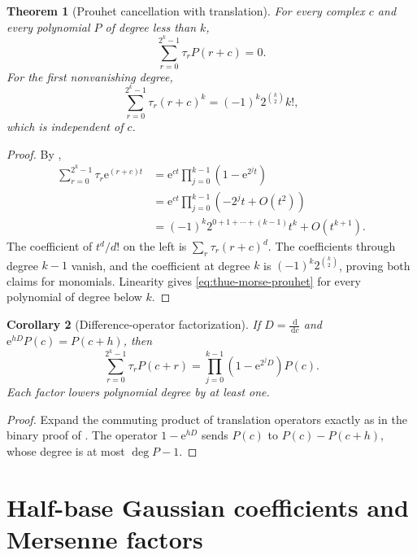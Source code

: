 \documentclass[11pt,oneside,openany]{book}
\newtheorem{theorem}{Theorem}[chapter]
\newtheorem{corollary}[theorem]{Corollary}
\theoremstyle{definition}
\theoremstyle{remark}
\newcommand{\e}{\mathrm e}
\newcommand{\dd}{\,\mathrm d}
\begin{document}
\begin{theorem}[Prouhet cancellation with translation]\label{thm:thue-morse-prouhet}
For every complex $c$ and every polynomial $P$ of degree less than $k$,
\begin{equation}
 \sum_{r=0}^{2^k-1}\tau_rP(r+c)=0.\label{eq:thue-morse-prouhet}
\end{equation}
For the first nonvanishing degree,
\begin{equation}
 \sum_{r=0}^{2^k-1}\tau_r(r+c)^k
 =(-1)^k2^{\binom k2}k!,\label{eq:thue-morse-first-moment}
\end{equation}
which is independent of $c$.
\end{theorem}

\begin{proof}
By ,
\begin{align*}
 \sum_{r=0}^{2^k-1}\tau_r\e^{(r+c)t}
 &=\e^{ct}\prod_{j=0}^{k-1}(1-\e^{2^jt})\\
 &=\e^{ct}\prod_{j=0}^{k-1}
 \left(-2^jt+O(t^2)\right)\\
 &=(-1)^k2^{0+1+\cdots+(k-1)}t^k+O(t^{k+1}).
\end{align*}
The coefficient of $t^d/d!$ on the left is
$\sum_r\tau_r(r+c)^d$.  The coefficients through degree $k-1$ vanish, and the coefficient at degree $k$ is $(-1)^k2^{\binom k2}$, proving both claims for monomials.  Linearity gives \eqref{eq:thue-morse-prouhet} for every polynomial of degree below $k$.
\end{proof}

\begin{corollary}[Difference-operator factorization]\label{cor:thue-morse-difference-operator}
If $D=\frac{\dd}{\dd c}$ and $\e^{hD}P(c)=P(c+h)$, then
\begin{equation}
 \sum_{r=0}^{2^k-1}\tau_rP(c+r)
 =\prod_{j=0}^{k-1}(1-\e^{2^jD})P(c).\label{eq:thue-morse-difference-operator}
\end{equation}
Each factor lowers polynomial degree by at least one.
\end{corollary}

\begin{proof}
Expand the commuting product of translation operators exactly as in the binary proof of .  The operator $1-\e^{hD}$ sends $P(c)$ to $P(c)-P(c+h)$, whose degree is at most $\deg P-1$.
\end{proof}

\section{Half-base Gaussian coefficients and Mersenne factors}
\end{document}
